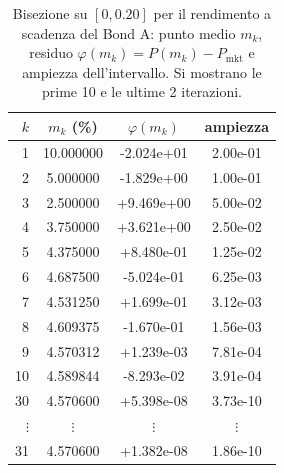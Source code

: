 \begin{table}[H]\centering\small
\caption{Bisezione su $[0,0.20]$ per il rendimento a scadenza del Bond A: punto medio $m_k$, residuo $\varphi(m_k)=P(m_k)-P_{\mathrm{mkt}}$ e ampiezza dell'intervallo. Si mostrano le prime 10 e le ultime 2 iterazioni.}
\label{tab:bisezione-ytm}\renewcommand{\arraystretch}{1.1}
\begin{tabular}{rccc}
\toprule
$k$ & $m_k$ (\%) & $\varphi(m_k)$ & ampiezza\\
\midrule
\rowcolor{rowtint}1 & 10.000000 & -2.024e+01 & 2.00e-01\\
2 & 5.000000 & -1.829e+00 & 1.00e-01\\
\rowcolor{rowtint}3 & 2.500000 & +9.469e+00 & 5.00e-02\\
4 & 3.750000 & +3.621e+00 & 2.50e-02\\
\rowcolor{rowtint}5 & 4.375000 & +8.480e-01 & 1.25e-02\\
6 & 4.687500 & -5.024e-01 & 6.25e-03\\
\rowcolor{rowtint}7 & 4.531250 & +1.699e-01 & 3.12e-03\\
8 & 4.609375 & -1.670e-01 & 1.56e-03\\
\rowcolor{rowtint}9 & 4.570312 & +1.239e-03 & 7.81e-04\\
10 & 4.589844 & -8.293e-02 & 3.91e-04\\
30 & 4.570600 & +5.398e-08 & 3.73e-10\\
$\vdots$ & $\vdots$ & $\vdots$ & $\vdots$\\
\rowcolor{rowtint}31 & 4.570600 & +1.382e-08 & 1.86e-10\\
\bottomrule
\end{tabular}
\end{table}
